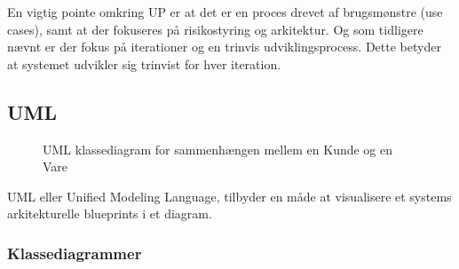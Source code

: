 En vigtig pointe omkring UP er at det er en proces drevet af brugsmønstre (use cases), samt at der fokuseres på risikostyring og arkitektur. Og som tidligere nævnt er der fokus på iterationer og en trinvis udviklingsprocess. Dette betyder at systemet udvikler sig trinvist for hver iteration.


\subsection{UML}

\begin{wrapfigure}{r}{0.26\textwidth}
    \vspace{0cm}
  \caption{UML klassediagram for sammenhængen mellem en Kunde og en Vare}
  \label{fig:UML eksempel}
\end{wrapfigure} 

UML eller Unified Modeling Language, tilbyder en måde at visualisere et systems arkitekturelle blueprints i et diagram. 





\subsubsection{Klassediagrammer}

